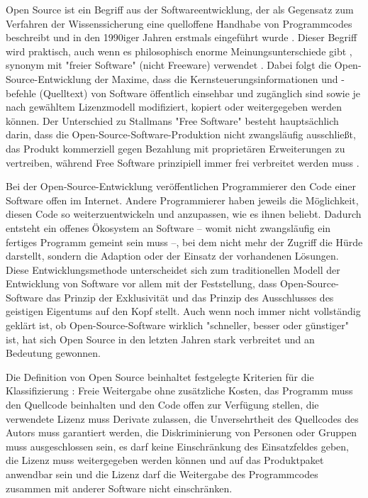 Open Source ist ein Begriff aus der Softwareentwicklung, der als Gegensatz zum Verfahren der Wissenssicherung \cite{stallman2002} eine quelloffene Handhabe von Programmcodes beschreibt und in den 1990iger Jahren erstmals eingeführt wurde \cite[:5]{hippel_2003_open}. Dieser Begriff wird praktisch, auch wenn es philosophisch enorme Meinungsunterschiede gibt \cite[:5]{hippel_2003_open}  \cite[:169]{stallman2002}, synonym mit "freier Software" (nicht Freeware) verwendet \cite{naeder_2010_open} \cite[:414]{mantz_2007_open}. Dabei folgt die Open-Source-Entwicklung der Maxime, dass die Kernsteuerungsinformationen und -befehle (Quelltext) von Software öffentlich einsehbar und zugänglich sind sowie je nach gewähltem Lizenzmodell modifiziert, kopiert oder weitergegeben werden können. Der Unterschied zu Stallmans "Free Software" besteht hauptsächlich darin, dass die Open-Source-Software-Produktion nicht zwangsläufig ausschließt, das Produkt kommerziell gegen Bezahlung mit proprietären Erweiterungen zu vertreiben, während Free Software prinzipiell immer frei verbreitet werden muss \cite{stallman2002}.

Bei der Open-Source-Entwicklung veröffentlichen Programmierer den Code einer Software offen im Internet. Andere Programmierer haben jeweils die Möglichkeit, diesen Code so weiterzuentwickeln und anzupassen, wie es ihnen beliebt. Dadurch entsteht ein offenes Ökosystem an Software – womit nicht zwangsläufig ein fertiges Programm gemeint sein muss –, bei dem nicht mehr der Zugriff die Hürde darstellt, sondern die Adaption oder der Einsatz der vorhandenen Lösungen. Diese Entwicklungsmethode unterscheidet sich zum traditionellen Modell der Entwicklung von Software vor allem mit der Feststellung, dass Open-Source-Software das Prinzip der Exklusivität und das Prinzip des Ausschlusses des geistigen Eigentums auf den Kopf stellt. Auch wenn noch immer nicht vollständig geklärt ist, ob Open-Source-Software wirklich "schneller, besser oder günstiger" ist, hat sich Open Source in den letzten Jahren stark verbreitet \cite{Lerner_2001} und an Bedeutung gewonnen.

Die Definition von Open Source beinhaltet festgelegte Kriterien für die Klassifizierung \cite{osd_2003}: Freie Weitergabe ohne zusätzliche Kosten, das Programm muss den Quellcode beinhalten und den Code offen zur Verfügung stellen, die verwendete Lizenz muss Derivate zulassen, die Unversehrtheit des Quellcodes des Autors muss garantiert werden, die Diskriminierung von Personen oder Gruppen muss ausgeschlossen sein, es darf keine Einschränkung des Einsatzfeldes geben, die Lizenz muss weitergegeben werden können und auf das Produktpaket anwendbar sein und die Lizenz darf die Weitergabe des Programmcodes zusammen mit anderer Software nicht einschränken.

